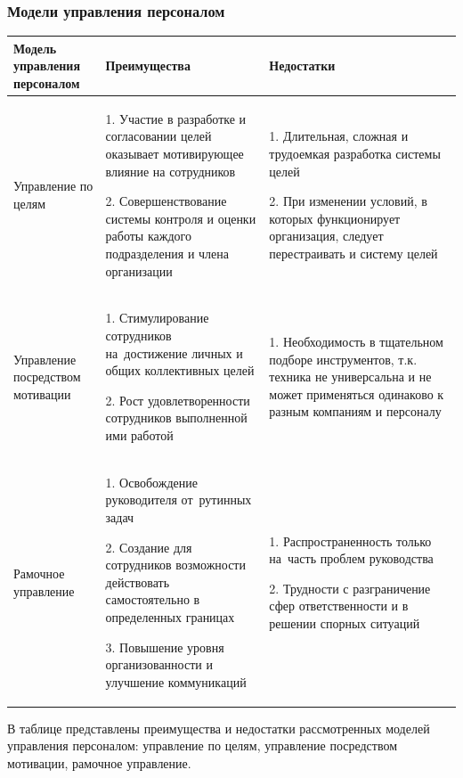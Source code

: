 \documentclass{../industrial-development}
\begin{document}
\begin{frame} \frametitle{Модели управления персоналом}
	\begin{table}[h]
\begin{center}
\begin{tabular}{|p{}|p{}|p{}|}
\hline
\tiny \textbf{Модель управления персоналом}   & \tiny \textbf{Преимущества} & \tiny \textbf{Недостатки} \\
\hline
\tiny Управление по целям & 
\tiny 1. Участие в разработке и согласовании целей оказывает мотивирующее влияние на сотрудников

2. Совершенствование системы контроля и оценки работы каждого подразделения и члена организации
& 
\tiny 1. Длительная, сложная и трудоемкая разработка системы целей 

2. При изменении условий, в которых функционирует организация, следует перестраивать и систему целей \\
\hline
\tiny Управление посредством мотивации & 
\tiny 1. Стимулирование сотрудников на~достижение личных и общих коллективных целей

2. Рост удовлетворенности сотрудников выполненной ими работой

&
\tiny 1. Необходимость в тщательном подборе инструментов, т.к. техника не универсальна и не может применяться одинаково к разным компаниям и персоналу

\\
\hline
\tiny Рамочное управление  & 

\tiny
1. Освобождение руководителя от~рутинных задач

2. Создание для сотрудников возможности действовать самостоятельно в определенных границах

3. Повышение уровня организованности и улучшение коммуникаций
&
\tiny 
1. Распространенность только на~часть проблем руководства

2. Трудности с разграничение сфер ответственности и в решении спорных ситуаций
\\

\hline
 \end{tabular}
  \end{center}
   \end{table}
		\end{frame}

\lecturenotes

В таблице представлены преимущества и недостатки рассмотренных моделей управления персоналом: управление по целям, управление посредством мотивации, рамочное управление.
\end{document}
